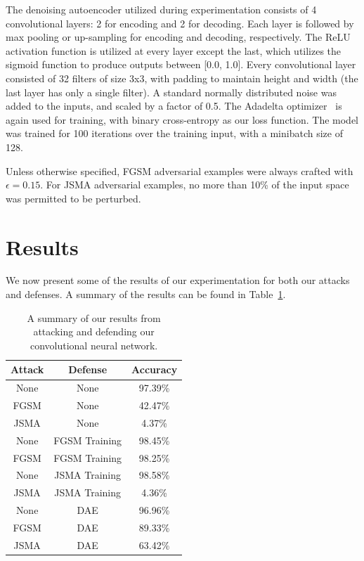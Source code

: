 \documentclass{article}
\begin{document}
The denoising autoencoder utilized during experimentation consists of 4
convolutional layers: 2 for encoding and 2 for decoding. Each layer is followed
by max pooling or up-sampling for encoding and decoding, respectively. The ReLU
activation function is utilized at every layer except the last, which utilizes
the sigmoid function to produce outputs between [0.0, 1.0]. Every convolutional
layer consisted of 32 filters of size 3x3, with padding to maintain height and
width (the last layer has only a single filter). A standard normally distributed
noise was added to the inputs, and scaled by a factor of 0.5. The Adadelta
optimizer~\cite{zeiler2012adadelta} is again used for training, with binary
cross-entropy as our loss function. The model was trained for 100 iterations
over the training input, with a minibatch size of 128.

Unless otherwise specified, FGSM adversarial examples were always crafted with
$\epsilon=0.15$. For JSMA adversarial examples, no more than 10\% of the input
space was permitted to be perturbed.

\section{Results}

We now present some of the results of our experimentation for both our attacks
and defenses. A summary of the results can be found in
Table~\ref{table:results}.

\begin{table}
  \begin{center}
    \begin{tabular}{| c | c | c |}
      \hline
      Attack & Defense & Accuracy\\
      \hline
      None & None & 97.39\%\\
      \hline
      FGSM & None & 42.47\%\\
      \hline
      JSMA & None & 4.37\%\\
      \hline
      None & FGSM Training & 98.45\%\\
      \hline
      FGSM & FGSM Training & 98.25\%\\
      \hline
      None & JSMA Training & 98.58\%\\
      \hline
      JSMA & JSMA Training & 4.36\%\\
      \hline
      None & DAE & 96.96\%\\
      \hline
      FGSM & DAE & 89.33\%\\
      \hline
      JSMA & DAE & 63.42\%\\
      \hline
    \end{tabular}
  \end{center}
  \caption{A summary of our results from attacking and defending our
  convolutional neural network.}%
  \label{table:results}
\end{table}
\end{document}
